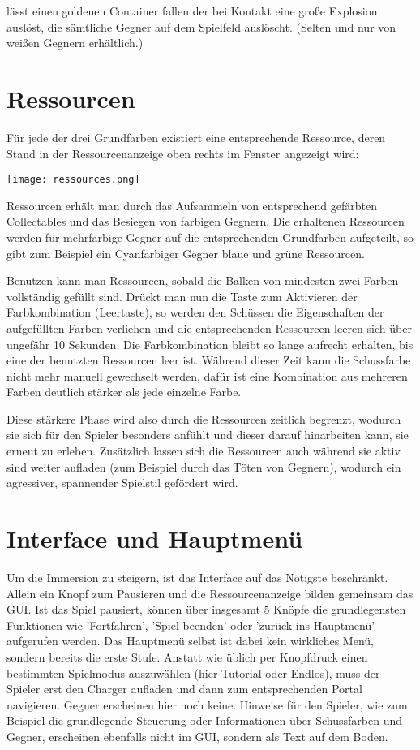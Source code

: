 \documentclass[a4paper,10pt,ngerman,fontsize=12pt]{scrreprt}
\begin{document}
{lässt einen goldenen Container fallen der bei Kontakt eine gro{\ss}e Explosion auslöst, die sämtliche Gegner auf dem Spielfeld auslöscht. (Selten und nur von wei{\ss}en Gegnern erhältlich.)}




\section{Ressourcen}

Für jede der drei Grundfarben existiert eine entsprechende Ressource, deren Stand in der Ressourcenanzeige oben rechts im Fenster angezeigt wird:

\texttt{[image: ressources.png]}

Ressourcen erhält man durch das Aufsammeln von entsprechend gefärbten Collectables und das Besiegen von farbigen Gegnern. Die erhaltenen Ressourcen werden für mehrfarbige Gegner auf die entsprechenden Grundfarben aufgeteilt, so gibt zum Beispiel ein Cyanfarbiger Gegner blaue und grüne Ressourcen.

Benutzen kann man Ressourcen, sobald die Balken von mindesten zwei Farben vollständig gefüllt sind. Drückt man nun die Taste zum Aktivieren der Farbkombination (Leertaste), so werden den Schüssen die Eigenschaften der aufgefüllten Farben verliehen und die entsprechenden Ressourcen leeren sich über ungefähr 10 Sekunden. Die Farbkombination bleibt so lange aufrecht erhalten, bis eine der benutzten Ressourcen leer ist. Während dieser Zeit kann die Schussfarbe nicht mehr manuell gewechselt werden, dafür ist eine Kombination aus mehreren Farben deutlich stärker als jede einzelne Farbe.

Diese stärkere Phase wird also durch die Ressourcen zeitlich begrenzt, wodurch sie sich für den Spieler besonders anfühlt und dieser darauf hinarbeiten kann, sie erneut zu erleben. Zusätzlich lassen sich die Ressourcen auch während sie aktiv sind weiter aufladen (zum Beispiel durch das Töten von Gegnern), wodurch ein agressiver, spannender Spielstil gefördert wird.



\section{Interface und Hauptmenü}

Um die Immersion zu steigern, ist das Interface auf das Nötigste beschränkt. Allein ein Knopf zum Pausieren und die Ressourcenanzeige bilden gemeinsam das GUI. Ist das Spiel pausiert, können über insgesamt 5 Knöpfe die grundlegensten Funktionen wie 'Fortfahren', 'Spiel beenden' oder 'zurück ins Hauptmenü'  aufgerufen werden. 
Das Hauptmenü selbst ist dabei kein wirkliches Menü, sondern bereits die erste Stufe. Anstatt wie üblich per Knopfdruck einen bestimmten Spielmodus auszuwählen (hier Tutorial oder Endlos), muss der Spieler erst den Charger aufladen und dann zum entsprechenden Portal navigieren. Gegner erscheinen hier noch keine. Hinweise für den Spieler, wie zum Beispiel die grundlegende Steuerung oder Informationen über Schussfarben und Gegner, erscheinen ebenfalls nicht im GUI, sondern als Text auf dem Boden. 
\end{document}
